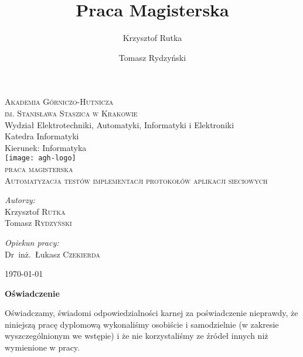 \documentclass[a4paper,oneside,12pt]{mwbk}
\title{Praca Magisterska}
\author{Krzysztof Rutka \and Tomasz Rydzyński}
\begin{document}
\frontmatter

\begin{titlepage}

\begin{center}

\textsc{\LARGE Akademia Górniczo-Hutnicza\\ \Large im. Stanisława Staszica w Krakowie}\\[0.5cm]

Wydział Elektrotechniki, Automatyki, Informatyki i Elektroniki\\
Katedra Informatyki\\
Kierunek: Informatyka\\[1.5cm]

\texttt{[image: agh-logo]}\\[1.0cm]    

\textsc{\Large praca magisterska}\\[0.5cm]


\textsc{\LARGE Automatyzacja testów implementacji protokołów aplikacji sieciowych}\\[0.4cm]

\vfill

\begin{minipage}[t]{0.49\textwidth}
\begin{flushleft} \large
\emph{Autorzy:}\\
Krzysztof \textsc{Rutka} \\
Tomasz \textsc{Rydzyński} \\
\end{flushleft}
\end{minipage}
\begin{minipage}[t]{0.49\textwidth}
\begin{flushright} \large
\emph{Opiekun pracy:} \\
Dr~inż.~Łukasz \textsc{Czekierda}
\vfill
\end{flushright}
\end{minipage}

\vfill

{\large \today}

\end{center}

\end{titlepage}

\clearpage
\pagestyle{empty}
{\textbf{\Large{Oświadczenie}}}

Oświadczamy, świadomi odpowiedzialności karnej za poświadczenie nieprawdy, że
niniejszą pracę dyplomową wykonaliśmy osobiście i samodzielnie (w zakresie
wyszczególnionym we wstępie) i że nie korzystaliśmy ze źródeł innych niż
wymienione w pracy.
\clearpage
\end{document}

